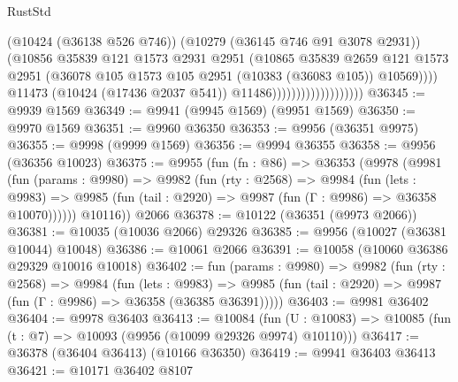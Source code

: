\begin{lexlean}{RustStd}
\begin{coremodule}
                                            (@10424 (@36138 @526 @746))
                                            (@10279 (@36145 @746 @91 @3078 @2931))
                                            (@10856
                                              @35839
                                              @121
                                              @1573
                                              @2931
                                              @2951
                                              (@10865
                                                @35839
                                                @2659
                                                @121
                                                @1573
                                                @2951
                                                (@36078
                                                  @105
                                                  @1573
                                                  @105
                                                  @2951
                                                  (@10383 (@36083 @105))
                                                  @10569))))
                                          @11473
                                          (@10424 (@17436 @2037 @541))
                                          @11486)))))))))))))))))))
@36345 := @9939 @1569
@36349 := @9941 (@9945 @1569) (@9951 @1569)
@36350 := @9970 @1569
@36351 := @9960 @36350
@36353 := @9956 (@36351 @9975)
@36355 := @9998 (@9999 @1569)
@36356 := @9994 @36355
@36358 := @9956 (@36356 @10023)
@36375 := @9955
    (fun (fn : @86) =>
    @36353
      (@9978
        (@9981
          (fun (params : @9980) =>
          @9982
            (fun (rty : @2568) =>
            @9984
              (fun (lets : @9983) =>
              @9985 (fun (tail : @2920) => @9987 (fun (Γ : @9986) => @36358 @10070))))))
        @10116))
    @2066
@36378 := @10122 (@36351 (@9973 @2066))
@36381 := @10035 (@10036 @2066) @29326
@36385 := @9956 (@10027 (@36381 @10044) @10048)
@36386 := @10061 @2066
@36391 := @10058 (@10060 @36386 @29329 @10016 @10018)
@36402 := fun (params : @9980) =>
  @9982
    (fun (rty : @2568) =>
    @9984
      (fun (lets : @9983) =>
      @9985 (fun (tail : @2920) => @9987 (fun (Γ : @9986) => @36358 (@36385 @36391)))))
@36403 := @9981 @36402
@36404 := @9978 @36403
@36413 := @10084
    (fun (U : @10083) => @10085 (fun (t : @7) => @10093 (@9956 (@10099 @29326 @9974) @10110)))
@36417 := @36378 (@36404 @36413) (@10166 @36350)
@36419 := @9941 @36403 @36413
@36421 := @10171 @36402 @8107

\end{coremodule}
\end{lexlean}

